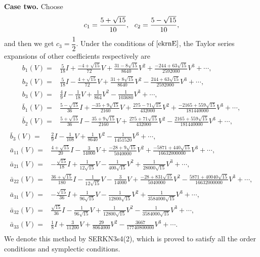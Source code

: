 \documentclass{article}
\begin{document}
 \textbf{Case two.} Choose
\begin{equation}
\begin{array}
[c]{ll}c_{1}=\dfrac{5+\sqrt{15}}{10},\ \
c_{2}=\dfrac{5-\sqrt{15}}{10},
 \end{array}
  \label{ekrnE}%
\end{equation}
and then we get $c_{3}=\dfrac{1}{2}$. Under the conditions of
$\eqref{ekrnE}$,
 the Taylor series expansions of
other coefficients respectively are
\begin{equation}
\begin{aligned}
b_1(V)=&   \frac{5}{18}I  + \frac{-4+\sqrt{15}}{72} V +
\frac{31-8\sqrt{15}}{8640} V^2 + \frac{-244+63\sqrt{15}}{2592000}
V^3 +\cdots  ,
\\
b_2(V)=& \frac{5}{18}I - \frac{4+\sqrt{15}}{72} V  +
\frac{31+8\sqrt{15}}{8640}V^2 -\frac{244+63\sqrt{15}}{2592000} V^3
+\cdots,
\\
b_3(V)=&\frac{4}{9}I-\frac{1}{18} V +\frac{1}{864}
V^2-\frac{1}{103680} V^3 +\cdots
,\\
\bar{b}_1(V)=& \frac{5-\sqrt{15}}{36}I + \frac{-35+9\sqrt{15}}{2160}
  V +
\frac{275-71\sqrt{15}}{432000} V^2 +
\frac{-2165+559\sqrt{15}}{181440000}V^3  +\cdots
,\\
\bar{b}_2(V)=& \frac{5+\sqrt{15}}{36}I - \frac{35+9\sqrt{15}}{2160}
  V +
\frac{275+71\sqrt{15}}{432000} V^2
-\frac{2165+559\sqrt{15}}{181440000} V^3  +\cdots
,\\
\end{aligned}
\end{equation}
\begin{equation}
\begin{aligned}
\bar{b}_3(V)=&
 \frac{2}{9}I -\frac{1}{108}
  V +\frac{1}{8640} V^2 -\frac{1}{1451520} V^3  +\cdots
,\\
\bar{a}_{11}(V)=& \frac{4+\sqrt{15}}{20}I -\frac{3}{14000}V +
\frac{-28+9\sqrt{15}}{5040000} V^2
+\frac{-5871+440\sqrt{15}}{16632000000}V^3  +\cdots
,\\
\bar{a}_{21}(V)=&
 -\frac{\sqrt{15}}{18}I
+\frac{1}{12\sqrt{15}}V -\frac{1}{400\sqrt{15}}V^2 +
\frac{1}{28000\sqrt{15}}V^3 +\cdots
,\\
\bar{a}_{22}(V)=& \frac{36+\sqrt{15}}{180}I -\frac{1}{12\sqrt{15}}V
-\frac{3}{14000}V + \frac{-28+831\sqrt{15}}{5040000} V^2
-\frac{5871+40040\sqrt{15}}{16632000000}V^3 +\cdots
,\\
\bar{a}_{31}(V)=&
 -\frac{\sqrt{15}}{36}I
+\frac{1}{96\sqrt{15}}V -\frac{1}{12800\sqrt{15}}V^2 +
\frac{1}{3584000\sqrt{15}}V^3 +\cdots
,\\
\bar{a}_{32}(V)=&\frac{\sqrt{15}}{36}I -\frac{1}{96\sqrt{15}}V +
\frac{1}{12800\sqrt{15}}V^2 -\frac{1}{3584000\sqrt{15}}V^3   +\cdots
,\\
\bar{a}_{33}(V)=& \frac{1}{8}I +\frac{3}{11200}V +
\frac{29}{8064000}V^2 -\frac{3667}{17740800000}V^3 +\cdots .\\
\end{aligned}
\end{equation}
We denote this method by SERKN3s4(2), which  is proved to satisfy
all the order conditions and symplectic conditions.
\end{document}
